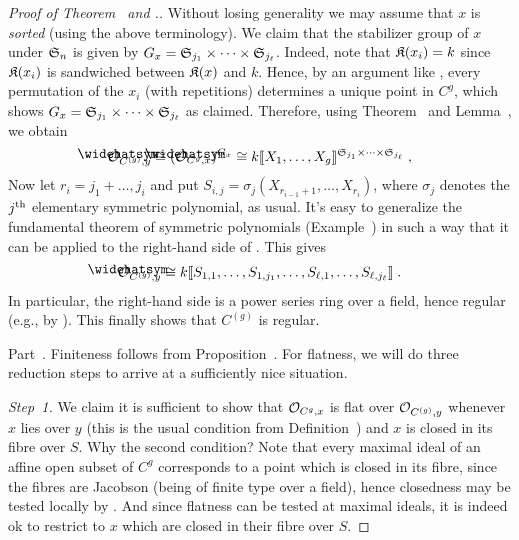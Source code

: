 \documentclass[a4paper,parskip=half,numbers=enddot, DIV=12]{scrreprt}
\begin{document}
\begin{proof}[Proof of Theorem~ and .]
	Without losing generality we may assume that $x$ is \emph{sorted} (using the above terminology). We claim that the stabilizer group of $x$ under $\mathfrak{S}_n$ is given by $G_x=\mathfrak{S}_{j_1}\times\cdots\times\mathfrak{S}_{j_\ell}$. Indeed, note that $\mathfrak{K}(x_i)=k$ since $\mathfrak{K}(x_i)$ is sandwiched between $\mathfrak{K}(x)$ and $k$. Hence, by an argument like , every permutation of the $x_i$ (with repetitions) determines a unique point in $C^g$, which shows $G_x=\mathfrak{S}_{j_1}\times\cdots\times\mathfrak{S}_{j_\ell}$ as claimed. Therefore, using Theorem~ and Lemma~, we obtain
	\begin{align}\lbl{eq:OCgx}
		\roof{\Oo}_{C^{(g)},y}\cong (\roof{\Oo}_{C^g,x})^{G_x}\cong k\llbracket X_1,\ldots,X_g\rrbracket^{\SS_{j_1}\times\cdots\times\SS_{j_\ell}}\;,
	\end{align}
	Now let $r_i=j_1+\ldots,j_i$ and put $S_{i,j}=\sigma_j\left(X_{r_{i-1}+1},\ldots,X_{r_i}\right)$, where $\sigma_j$ denotes the $j^{\text{th}}$ elementary symmetric polynomial, as usual. 
	It's easy to generalize the fundamental theorem of symmetric polynomials (Example~) in such a way that it can be applied to the right-hand side of . This gives
	\begin{align}\lbl{eq:OCgx2}
		\roof{\Oo}_{C^{(g)},y}\cong k\llbracket S_{1,1},\ldots,S_{1,j_1},\ldots,S_{\ell,1},\ldots,S_{\ell,j_\ell}\rrbracket\;.
	\end{align}
	In particular, the right-hand side is a power series ring over a field, hence regular (e.g., by \cite[Proposition~2.2.3]{homalg}). This finally shows that $C^{(g)}$ is regular.	
	
	Part~. Finiteness follows from Proposition~. For flatness, we will do three reduction steps to arrive at a sufficiently nice situation.
	
	\emph{Step~1.} We claim it is sufficient to show that $\mathcal{O}_{C^g,x}$ is flat over $\mathcal{O}_{C^{(g)},y}$ whenever $x$ lies over $y$ (this is the usual condition from Definition~) and $x$ is closed in its fibre over $S$. Why the second condition? Note that every maximal ideal of an affine open subset of $C^g$ corresponds to a point which is closed in its fibre, since the fibres are Jacobson (being of finite type over a field), hence closedness may be tested locally by \cite[Fact~2.4.1]{alggeo1}. And since flatness can be tested at maximal ideals, it is indeed ok to restrict to $x$ which are closed in their fibre over $S$.
	

\end{proof}
\end{document}
